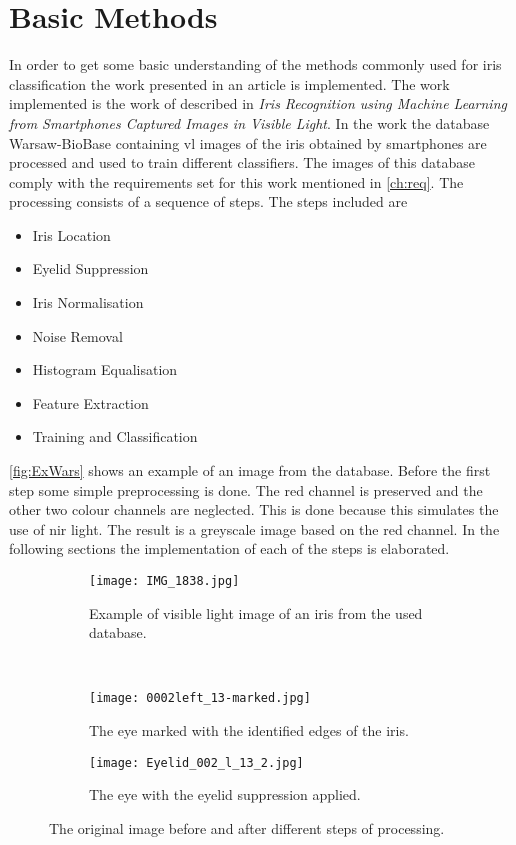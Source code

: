 \section{Basic Methods}
\label{BasicM}
In order to get some basic understanding of the methods commonly used for iris classification the work presented in an article is implemented. The work implemented is the work of \cite{Khan2017a} described in \textit{Iris Recognition using Machine Learning from Smartphones Captured Images in Visible Light}. In the work the database Warsaw-BioBase containing \gls{vl} images of the iris obtained by smartphones are processed and used to train different classifiers. The images of this database comply with the requirements set for this work mentioned in \autoref{ch:req}. The processing consists of a sequence of steps. The steps included are

\begin{itemize}
\item Iris Location
\item Eyelid Suppression
\item Iris Normalisation
\item Noise Removal
\item Histogram Equalisation 
\item Feature Extraction
\item Training and Classification
\end{itemize}
\autoref{fig:ExWars} shows an example of an image from the database. Before the first step some simple preprocessing is done. The red channel is preserved and the other two colour channels are neglected. This is done because this simulates the use of \gls{nir} light. The result is a greyscale image based on the red channel. In the following sections the implementation of each of the steps is elaborated. 

\begin{figure}[h]
\centering
\begin{subfigure}{.47\textwidth}
\centering
\texttt{[image: IMG\_1838.jpg]}
\caption{Example of visible light image of an iris from the used database.}
\label{fig:ExWars}
\end{subfigure}
~
\begin{subfigure}{.47\textwidth}
\centering
\texttt{[image: 0002left\_13-marked.jpg]}
\caption{The eye marked with the identified edges of the iris.}
\label{fig:MarkedI}
\end{subfigure}

\begin{subfigure}{.47\textwidth}
\centering
\texttt{[image: Eyelid\_002\_l\_13\_2.jpg]}
\caption{The eye with the eyelid suppression applied.}
\label{fig:IrisSup}
\end{subfigure}
\caption{The original image before and after different steps of processing.}
\end{figure}



